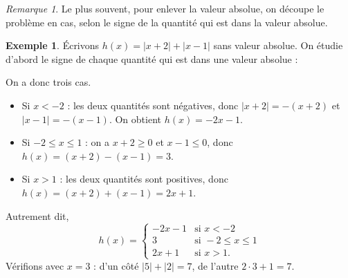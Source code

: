 \documentclass[12pt,a4paper]{article}
\theoremstyle{plain}
\theoremstyle{definition}
\newtheorem{example}[theorem]{Exemple}
\theoremstyle{remark}
\newtheorem*{remark}{Remarque}
\begin{document}
\begin{center}
\end{center}

\begin{remark}
  Le plus souvent, pour enlever la valeur absolue, on découpe le problème en cas,
  selon le signe de la quantité qui est dans la valeur absolue.
\end{remark}

\begin{example}
  Écrivons $h(x) = \lvert x + 2 \rvert + \lvert x - 1 \rvert$ sans valeur absolue.
  On étudie d'abord le signe de chaque quantité qui est dans une valeur absolue :
  
  \begin{center}
  \end{center}
  
  On a donc trois cas.
  \begin{itemize}
    \item Si $x < -2$ : les deux quantités sont négatives, donc
    $\lvert x + 2 \rvert = -(x + 2)$ et $\lvert x - 1 \rvert = -(x - 1)$.
    On obtient $h(x) = -2x - 1$.
    \item Si $-2 \le x \le 1$ : on a $x + 2 \ge 0$ et $x - 1 \le 0$, donc
    $h(x) = (x + 2) - (x - 1) = 3$.
    \item Si $x > 1$ : les deux quantités sont positives, donc
    $h(x) = (x + 2) + (x - 1) = 2x + 1$.
  \end{itemize}
  Autrement dit,
  \[
  h(x) =
  \begin{cases}
    -2x - 1 & \text{si } x < -2 \\
    3 & \text{si } -2 \le x \le 1 \\
    2x + 1 & \text{si } x > 1.
  \end{cases}
  \]
  Vérifions avec $x = 3$ : d'un côté $\lvert 5 \rvert + \lvert 2 \rvert = 7$,
  de l'autre $2 \cdot 3 + 1 = 7$.
\end{example}
\end{document}
